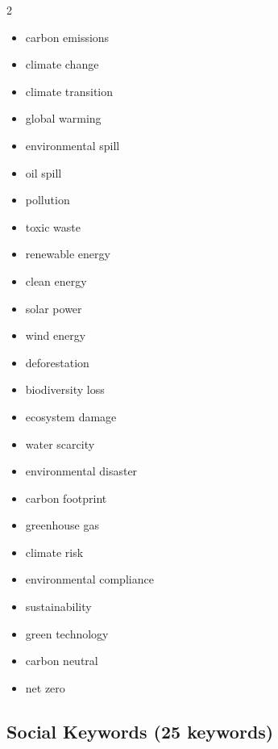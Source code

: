 \documentclass[12pt,a4paper]{article}
\begin{document}
\begin{multicols}{2}
\begin{itemize}[itemsep=0.2em]
    \item carbon emissions
    \item climate change
    \item climate transition
    \item global warming
    \item environmental spill
    \item oil spill
    \item pollution
    \item toxic waste
    \item renewable energy
    \item clean energy
    \item solar power
    \item wind energy
    \item deforestation
    \item biodiversity loss
    \item ecosystem damage
    \item water scarcity
    \item environmental disaster
    \item carbon footprint
    \item greenhouse gas
    \item climate risk
    \item environmental compliance
    \item sustainability
    \item green technology
    \item carbon neutral
    \item net zero
\end{itemize}
\end{multicols}

\subsection{Social Keywords (25 keywords)}
\end{document}

